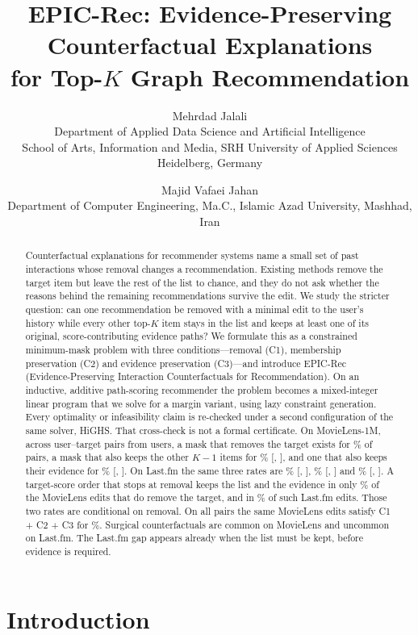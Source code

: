 \documentclass[11pt]{article}
\title{EPIC-Rec: Evidence-Preserving Counterfactual Explanations\\for Top-$K$ Graph Recommendation}
\author{Mehrdad Jalali\\
\small Department of Applied Data Science and Artificial Intelligence\\
\small School of Arts, Information and Media, SRH University of Applied Sciences Heidelberg, Germany
\and
Majid Vafaei Jahan\\
\small Department of Computer Engineering, Ma.C., Islamic Azad University, Mashhad, Iran}
\date{}
\begin{document}
\maketitle

\begin{abstract}
Counterfactual explanations for recommender systems name a small set of past interactions whose removal changes a
recommendation. Existing methods remove the target item but leave the rest of the list to chance, and they do not ask
whether the reasons behind the remaining recommendations survive the edit. We study the stricter question: can one
recommendation be removed with a minimal edit to the user's history while every other top-$K$ item stays in the list
and keeps at least one of its original, score-contributing evidence paths? We formulate this as a constrained
minimum-mask problem with three conditions---removal (C1), membership preservation (C2) and evidence preservation
(C3)---and introduce EPIC-Rec (Evidence-Preserving Interaction Counterfactuals for Recommendation). On an inductive, additive path-scoring recommender the problem becomes a mixed-integer linear program that we solve
for a margin variant, using lazy constraint generation. Every optimality or infeasibility claim is
re-checked under a second configuration of the same solver, HiGHS. That cross-check is not a formal certificate. On MovieLens-1M, across \NPairs{} user--target pairs from \NUsers{}
users, a mask that removes the target exists for \MLAExists\% of pairs, a mask that also keeps the other $K-1$ items
for \MLBExists\% [\MLBExistsLo, \MLBExistsHi], and one that also keeps their evidence for \MLCExists\% [\MLCExistsLo,
\MLCExistsHi]. On Last.fm the same three rates are \LFAExists\% [\LFAExistsLo, \LFAExistsHi], \LFBExists\%
[\LFBExistsLo, \LFBExistsHi] and \LFCExists\% [\LFCExistsLo, \LFCExistsHi]. A target-score order that stops at
removal keeps the list and the evidence in only \MLCStopAll\% of the MovieLens edits that do remove the target, and
in \LFCStopAll\% of such Last.fm edits. Those two rates are conditional on removal. On all \NPairs{} pairs the same
MovieLens edits satisfy C1 + C2 + C3 for \MLCgreedytargetscorecOneStopSucc\%. Surgical counterfactuals are common on
MovieLens and uncommon on Last.fm. The Last.fm gap appears already when the list must be kept, before evidence is
required.
\end{abstract}

\section{Introduction}
\end{document}
